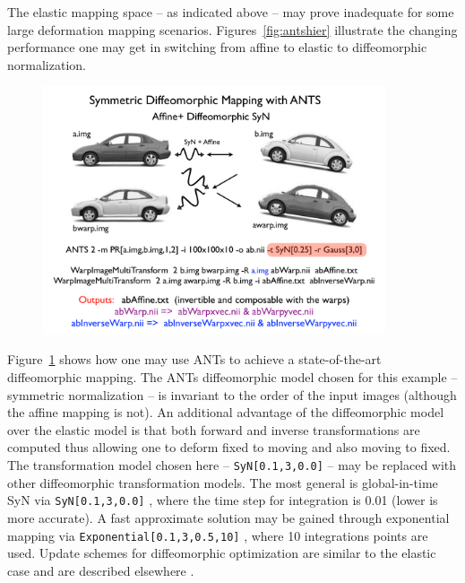 \documentclass{InsightArticle}
\begin{document}
  The elastic 
mapping space -- as indicated above -- may prove inadequate 
for some large deformation mapping scenarios.  Figures~\ref{fig:antshier} 
illustrate the changing performance one may get in switching from affine 
to elastic to diffeomorphic normalization.  
\begin{figure}
\includegraphics[width=0.9\textwidth]{./Figures/ANTSsyn.pdf} 
\vspace{-0.1in}
\label{fig:antssyn}
\end{figure}
Figure~\ref{fig:antssyn} shows 
how one may use ANTs to achieve a state-of-the-art diffeomorphic mapping. 
The ANTs diffeomorphic model chosen for this example -- symmetric normalization \cite{Avants2008b,Kim2008} -- 
is invariant to the order of the input images (although the affine mapping is not).  
An additional advantage of the diffeomorphic model over the elastic model is 
that both forward and inverse transformations are computed thus allowing one 
to deform fixed to moving and also moving to fixed.   The transformation model 
chosen here -- \texttt{SyN[0.1,3,0.0]} -- may be replaced with other 
diffeomorphic transformation models.  The most general is global-in-time SyN via \texttt{SyN[0.1,3,0.0]}   , 
where the time step for integration is 0.01 (lower is more accurate).  A fast approximate 
solution may be gained through 
exponential mapping via \texttt{Exponential[0.1,3,0.5,10]} , where 10 integrations points are used. 
Update schemes for diffeomorphic optimization are similar to the elastic case 
and are described elsewhere \cite{Avants2008b}.   
\end{document}
